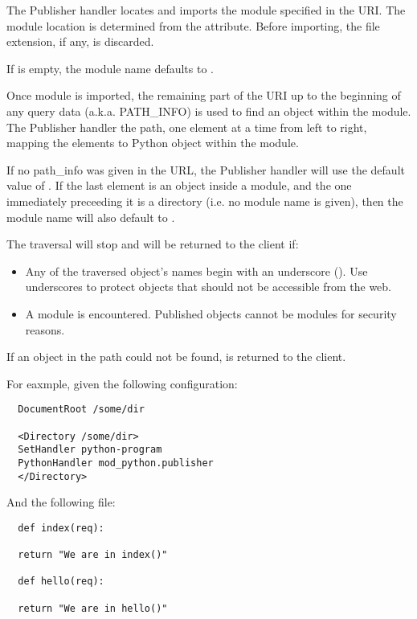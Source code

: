 The Publisher handler locates and imports the module specified in the
URI. The module location is determined from the 
attribute. Before importing, the file extension, if any, is
discarded. 

If  is empty, the module name defaults to
.

Once module is imported, the remaining part of the URI up to the
beginning of any query data (a.k.a. PATH_INFO) is used to find an
object within the module. The Publisher handler  the 
path, one element at a time from left to right, mapping the elements
to Python object within the module.

If no path_info was given in the URL, the Publisher handler will use
the default value of . If the last element is an object inside
a module, and the one immediately preceeding it is a directory
(i.e. no module name is given), then the module name will also default
to .

The traversal will stop and  will be returned to
the client if:

\begin{itemize}

\item
  Any of the traversed object's names begin with an underscore
  (\samp{\_}). Use underscores to protect objects that should not be
  accessible from the web.

\item
  A module is encountered. Published objects cannot be modules for
  security reasons.

\end{itemize}

If an object in the path could not be found, 
is returned to the client.

For eaxmple, given the following configuration:

\begin{verbatim}
  DocumentRoot /some/dir

  <Directory /some/dir>
  SetHandler python-program
  PythonHandler mod_python.publisher
  </Directory>
\end{verbatim}

And the following  file:

\begin{verbatim}
  def index(req):

  return "We are in index()"

  def hello(req):

  return "We are in hello()"
\end{verbatim}

